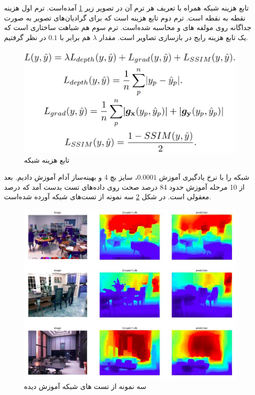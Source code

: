 \documentclass[12pt,a4paper]{report}
\begin{document}
تابع هزینه شبکه همراه با تعریف هر ترم آن در تصویر زیر \ref{unet_loss} آمده‌است.
ترم اول هزینه  نقطه به نقطه است.
ترم دوم تابع هزینه  است که برای گرادیان‌های تصویر به صورت جداگانه روی مولفه های  و 
محاسبه شده‌است.
ترم سوم هم شباهت ساختاری است که یک تابع هزینه رایج در بازسازی تصاویر است.
مقدار $\lambda$ هم برابر با $0.1$ در نظر گرفتیم.
\begin{figure}
  \centering
  \includegraphics[width=.7\textwidth]{Images//unet6.png}
  \caption{تابع هزینه شبکه }\label{unet_loss}
\end{figure}

شبکه را با نرخ یادگیری آموزش $0.0001$، سایز بچ 4 و بهینه‌ساز آدام آموزش دادیم.
بعد از 10 مرحله آموزش حدود 84 درصد صحت روی داده‌های تست بدست آمد که درصد معقولی است.
در شکل \ref{unet_test} سه نمونه از تست‌های شبکه آورده شده‌است.
\begin{figure}
  \centering
  \includegraphics[width=\textwidth]{Images//unet_test.png}
  \caption{سه نمونه از تست های شبکه آموزش دیده}\label{unet_test}
\end{figure}
\end{document}
